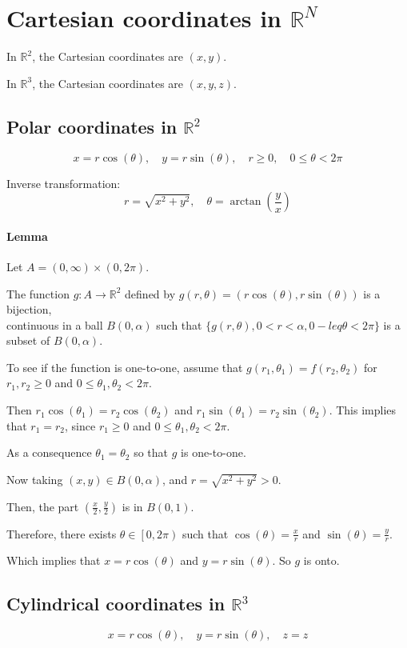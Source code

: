 \documentclass[11pt]{article}
\begin{document}
\section{Cartesian coordinates in $\mathbb{R}^N$}
In $\mathbb{R}^2$, the Cartesian coordinates are $(x,y)$.

In $\mathbb{R}^3$, the Cartesian coordinates are $(x,y,z)$.

\subsection{Polar coordinates in $\mathbb{R}^2$}
\[
x = r \cos(\theta), \quad y = r \sin(\theta), \quad r \geq 0, \quad 0 \leq \theta < 2\pi
\]

Inverse transformation:
\[
r = \sqrt{x^2 + y^2}, \quad \theta = \arctan\left(\frac{y}{x}\right)
\]

\paragraph{Lemma}
Let $A = (0, \infty) \times (0, 2\pi)$. 

The function $g : A \rightarrow \mathbb{R}^2$ defined by $g(r, \theta) = (r \cos(\theta), r \sin(\theta))$ is a bijection, \\
continuous in a ball $B(0, \alpha)$ such that $\{g(r, \theta), 0 < r < \alpha, 0 -leq \theta < 2\pi\}$ is a subset of $B(0, \alpha)$.

To see if the function is one-to-one, assume that $g(r_1, \theta_1) = f(r_2, \theta_2)$ for $r_1, r_2 \geq 0$ and $0 \leq \theta_1, \theta_2 < 2\pi$.

Then $r_1 \cos(\theta_1) = r_2 \cos(\theta_2)$ and $r_1 \sin(\theta_1) = r_2 \sin(\theta_2)$. This implies that $r_1 = r_2$, since $r_1 \geq 0$ and $0 \leq \theta_1, \theta_2 < 2\pi$.

As a consequence $\theta_1 = \theta_2$ so that $g$ is one-to-one.

Now taking $(x,y) \in B(0, \alpha)$, and $r = \sqrt{x^2 + y^2} > 0$.

Then, the part $(\frac{x}{2}, \frac{y}{2})$ is in $B(0, 1)$.

Therefore, there exists $\theta \in \left[0, 2\pi\right)$ such that $\cos(\theta) = \frac{x}{r}$ and $\sin(\theta) = \frac{y}{r}$.

Which implies that $x = r \cos(\theta)$ and $y = r \sin(\theta)$. So $g$ is onto.

\subsection{Cylindrical coordinates in $\mathbb{R}^3$}
\[
x = r \cos(\theta), \quad y = r \sin(\theta), \quad z = z
\]
\end{document}
